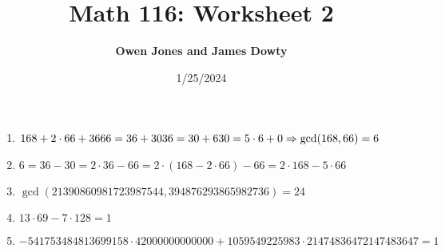 \documentclass[10pt]{article}
\title{\bf Math 116: Worksheet 2}
\date{1/25/2024}
\author{\bf Owen Jones and James Dowty}
\begin{document}
\maketitle
\begin{enumerate}[label= \arabic*.]
    \item $168+2\cdot 66+36\\
    66=36+30\\
    36=30+6\\
    30=5\cdot 6+0\\
    \Rightarrow \gcd(168,66)=6$
    \item $6=36-30=2\cdot36-66=2\cdot(168-2\cdot 66)-66=2\cdot 168-5\cdot 66$
    \item $\gcd(21390860981723987544, 394876293865982736)=24$
    \item $13\cdot 69-7\cdot 128=1$
    \item $-541753484813699158\cdot 42000000000000+1059549225983\cdot 21474836472147483647=1$

\end{enumerate}
\end{document}
